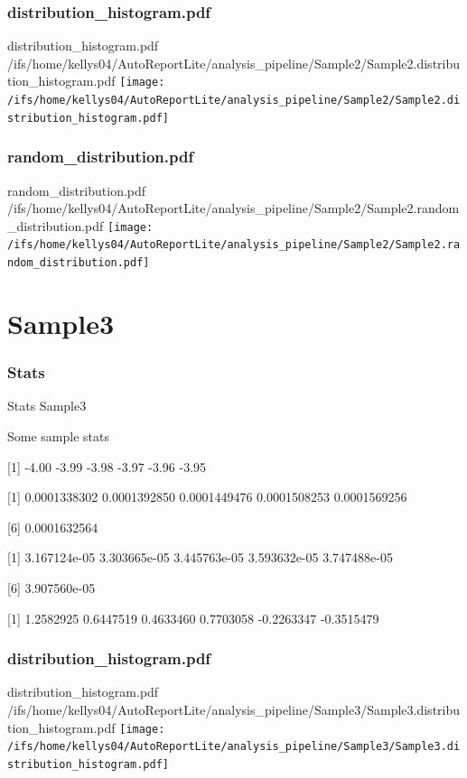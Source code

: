 \documentclass[8pt]{beamer}\usepackage[]{graphicx}\usepackage[]{color}
\begin{document}
\subsubsection{distribution\_histogram.pdf}
\begin{frame}{distribution\_histogram.pdf }
\scriptsize{/ifs/home/kellys04/AutoReportLite/analysis\_pipeline/Sample2/Sample2.distribution\_histogram.pdf}
\texttt{[image: /ifs/home/kellys04/AutoReportLite/analysis\_pipeline/Sample2/Sample2.distribution\_histogram.pdf]}
\end{frame}

\subsubsection{random\_distribution.pdf}
\begin{frame}{random\_distribution.pdf }
\scriptsize{/ifs/home/kellys04/AutoReportLite/analysis\_pipeline/Sample2/Sample2.random\_distribution.pdf}
\texttt{[image: /ifs/home/kellys04/AutoReportLite/analysis\_pipeline/Sample2/Sample2.random\_distribution.pdf]}
\end{frame}

\section{Sample3}
\subsubsection{Stats}
\begin{frame}{Stats }
Sample3 

Some sample stats

[1] -4.00 -3.99 -3.98 -3.97 -3.96 -3.95

[1] 0.0001338302 0.0001392850 0.0001449476 0.0001508253 0.0001569256

[6] 0.0001632564

[1] 3.167124e-05 3.303665e-05 3.445763e-05 3.593632e-05 3.747488e-05

[6] 3.907560e-05

[1]  1.2582925  0.6447519  0.4633460  0.7703058 -0.2263347 -0.3515479
\scriptsize{}
\end{frame}

\subsubsection{distribution\_histogram.pdf}
\begin{frame}{distribution\_histogram.pdf }
\scriptsize{/ifs/home/kellys04/AutoReportLite/analysis\_pipeline/Sample3/Sample3.distribution\_histogram.pdf}
\texttt{[image: /ifs/home/kellys04/AutoReportLite/analysis\_pipeline/Sample3/Sample3.distribution\_histogram.pdf]}
\end{frame}
\end{document}
